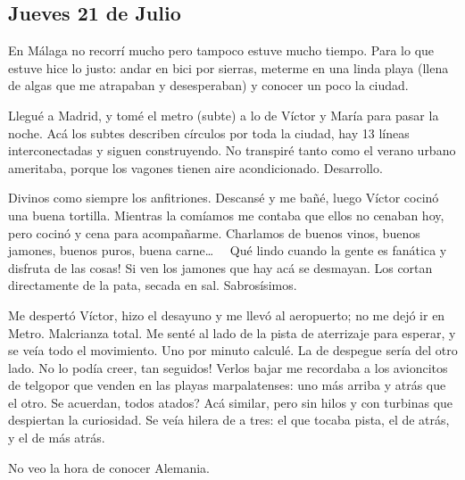 \subsection*{Jueves 21 de Julio}

En M\'alaga no recorr\'i mucho pero tampoco estuve mucho tiempo. Para lo que
estuve hice lo justo: andar en bici por sierras, meterme en una linda playa
(llena de algas que me atrapaban y desesperaban) y conocer un poco la ciudad.

Llegu\'e a Madrid, y tom\'e el metro (subte) a lo de V\'ictor y Mar\'ia para
pasar la noche. Ac\'a los subtes describen c\'irculos por toda la ciudad,
hay 13 l\'ineas interconectadas y siguen construyendo. No transpir\'e tanto
como el verano urbano ameritaba, porque los vagones tienen aire acondicionado.
Desarrollo.

Divinos como siempre los anfitriones. Descans\'e y me ba\~n\'e, luego V\'ictor
cocin\'o una buena tortilla. Mientras la com\'iamos me contaba que ellos no
cenaban hoy, pero cocin\'o y cena para acompa\~narme. Charlamos de buenos
vinos, buenos jamones, buenos puros, buena carne\ldots\ \ \textexclamdown
Qu\'e lindo cuando la gente es fan\'atica y disfruta de las cosas! Si ven los
jamones que hay ac\'a se desmayan. Los cortan directamente de la pata, secada
en sal. Sabros\'isimos.

Me despert\'o V\'ictor, hizo el desayuno y me llev\'o al aeropuerto; no me
dej\'o ir en Metro. Malcrianza total. Me sent\'e al lado de la pista de
aterrizaje para esperar, y se ve\'ia todo el movimiento. Uno por minuto
calcul\'e. La de despegue ser\'ia del otro lado. \textexclamdown No lo pod\'ia
creer, tan seguidos! Verlos bajar me recordaba a los avioncitos de telgopor que
venden en las playas marpalatenses: uno m\'as arriba y atr\'as que el otro.
\textquestiondown Se acuerdan, todos atados? Ac\'a similar, pero sin hilos y con
turbinas que despiertan la curiosidad. Se ve\'ia hilera de a tres: el que tocaba
pista, el de atr\'as, y el de m\'as atr\'as.

No veo la hora de conocer Alemania.
